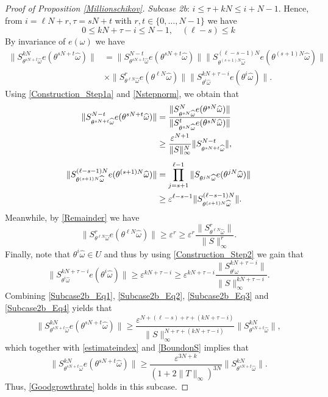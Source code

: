 \documentclass[10pt,a4paper]{amsart}
\newcommand{\eps}{\varepsilon}
\begin{document}
\begin{proof}[Proof of Proposition \ref{Millionschikov}]
\emph{Subcase 2b}: $i\leq \tau+kN\leq i+N-1$. Hence, from $i=\ell N+r, \tau=sN+t$ with $r,t\in \{0,\dots,N-1\}$ we have 
\begin{equation}\label{estimateindex}
0\leq kN+\tau-i\leq N-1,\quad (\ell-s)\leq k    
\end{equation}
By invariance of $e(\omega)$ we have 
\begin{align*}
\|S^{kN}_{\theta^{sN+t}\widehat\omega}e(\theta^{sN+t}\widehat\omega)\|
&=\|S^{N-t}_{\theta^{sN+t}\widehat\omega}e(\theta^{sN+t}\widehat\omega)\|\|S^{(\ell-s-1)N}_{\theta^{(s+1)N}\widehat\omega}e(\theta^{(s+1)N}\widehat\omega)\|\\[1ex]
&\times
\|S^{r}_{\theta^{\ell N}\widehat\omega}e(\theta^{\ell N}\widehat\omega)\|\|S^{kN+\tau-i}_{\theta^i\widehat\omega}e(\theta^i\widehat\omega)\|.
\end{align*}
Using \eqref{Construction_Step1a} and  \eqref{Nstepnorm}, we obtain that 
\begin{align}
\|S^{N-t}_{\theta^{sN+t}\widehat\omega}e(\theta^{sN+t}\widehat\omega)\|
&= \frac{\|S^{N}_{\theta^{sN}\widehat\omega}e(\theta^{sN}\widehat\omega)\|}{\|S^{t}_{\theta^{sN}\widehat\omega}e(\theta^{sN}\widehat\omega)\|}\notag\\
&\geq \frac{\eps^{N+1}}{\|S\|_{\infty}^N}\|S^{N-t}_{\theta^{sN+t}\widehat\omega}\|,\label{Subcase2b_Eq1}\\[1ex]
\|S^{(\ell-s-1)N}_{\theta^{(s+1)N}\widehat\omega}e(\theta^{(s+1)N}\widehat\omega)\|
&=\prod_{j=s+1}^{\ell-1}\|S_{\theta^{jN}\widehat\omega}e(\theta^{jN}\widehat\omega)\|\notag\\
&\geq 
\eps^{\ell-s-1} \|S^{(\ell-s-1)N}_{\theta^{(s+1)N}\widehat\omega}\|\label{Subcase2b_Eq2}.
\end{align}
Meanwhile, by \eqref{Remainder} we have 
\begin{equation}\label{Subcase2b_Eq3}
\|S^{r}_{\theta^{\ell N}\widehat\omega}e(\theta^{\ell N}\widehat\omega)\|
\geq \eps^r\geq \eps^r \frac{\|S^{r}_{\theta^{\ell N}\widehat\omega}\|}{\|S\|_{\infty}^r}.
\end{equation}
Finally, note that $\theta^i\widehat\omega\in U$ and thus by using \eqref{Construction_Step2} we gain that 
\begin{equation}\label{Subcase2b_Eq4}
\|S^{kN+\tau-i}_{\theta^i\widehat\omega}e(\theta^i\widehat\omega)\|\geq \eps^{kN+\tau-i}
\geq \eps^{kN+\tau-i}\frac{\|S^{kN+\tau-i}_{\theta^i\widehat\omega}\|}{\|S\|_{\infty}^{kN+\tau-i}}.
\end{equation}
Combining \eqref{Subcase2b_Eq1}, \eqref{Subcase2b_Eq2}, \eqref{Subcase2b_Eq3} and \eqref{Subcase2b_Eq4} yields that \[
\|S^{kN}_{\theta^{sN+t}\widehat\omega}e(\theta^{sN+t}\widehat\omega)\|
\geq 
\frac{\eps^{N+(\ell-s)+r+(kN+\tau-i)}}{\|S\|_{\infty}^{N+r+(kN+\tau-i)}}\|S^{kN}_{\theta^{sN+t}\widehat\omega}\|,
\]
which together with \eqref{estimateindex} and \eqref{BoundonS} implies that 
\[
\|S^{kN}_{\theta^{sN+t}\widehat\omega}e(\theta^{sN+t}\widehat\omega)\|
\geq 
\frac{\eps^{3N+k}}{(1+2\|T\|_{\infty})^{3N}}\|S^{kN}_{\theta^{sN+t}\widehat\omega}\|.
\]
Thus, \eqref{Goodgrowthrate} holds in this subcase. 


\end{proof}
\end{document}
